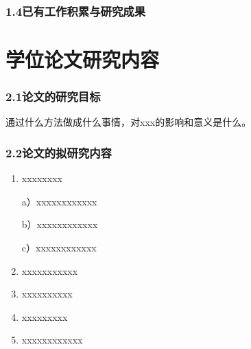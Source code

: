 \documentclass[12pt]{article}
\begin{document}

\begin{spacing}{1.2}
		\small
		
\end{spacing}




\subsubsection*{1.4已有工作积累与研究成果}


\clearpage
\newpage

\section{学位论文研究内容}
\subsubsection*{2.1论文的研究目标}

通过什么方法做成什么事情，对xxx的影响和意义是什么。

\subsubsection*{2.2论文的拟研究内容}

\begin{enumerate}
	\item[(1)] xxxxxxxx
	
	a）xxxxxxxxxxxx
	
    b）xxxxxxxxxxxx
	
	c）xxxxxxxxxxxx
	
	\item[(2)] xxxxxxxxxxx
	

	\item[(3)] xxxxxxxxxx
	



	\item[(4)] xxxxxxxxx
	

	
	\item[(5)] xxxxxxxxxxxx
	

\end{enumerate}
\end{document}
